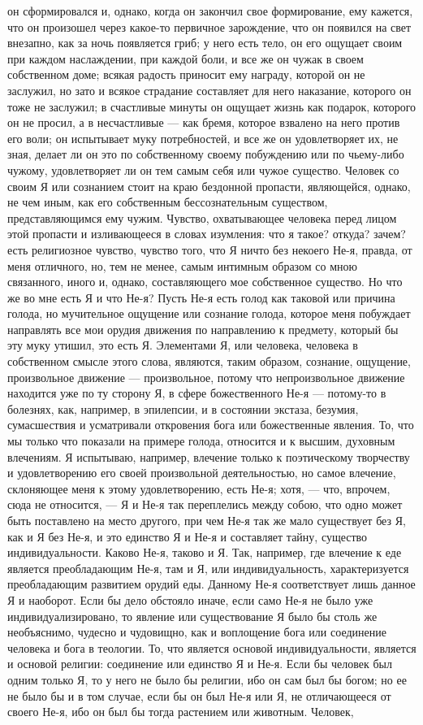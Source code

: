 \documentclass[12pt]{article}
\begin{document}
он сформировался и, однако, когда он закончил свое формирование, ему кажется, что он произошел через какое-то первичное зарождение, что он появился на свет внезапно, как за ночь появляется гриб; у него есть тело, он его ощущает своим при каждом наслаждении, при каждой боли, и все же он чужак в своем собственном доме; всякая радость приносит ему награду, которой он не заслужил, но зато и всякое страдание составляет для него наказание, которого он тоже не заслужил; в счастливые минуты он ощущает жизнь как подарок, которого он не просил, а в несчастливые --- как бремя, которое взвалено на него против его воли; он испытывает муку потребностей, и все же он удовлетворяет их, не зная, делает ли он это по собственному своему побуждению или по чьему-либо чужому, удовлетворяет ли он тем самым себя или чужое существо. Человек со своим Я или сознанием стоит на краю бездонной пропасти, являющейся, однако, не чем иным, как его собственным бессознательным существом, представляющимся ему чужим. Чувство, охватывающее человека перед лицом этой пропасти и изливающееся в словах изумления: что я такое? откуда? зачем? есть религиозное чувство, чувство того, что Я ничто без некоего Не-я, правда, от меня отличного, но, тем не менее, самым интимным образом со мною связанного, иного и, однако, составляющего мое собственное существо. Но что же во мне есть Я и что Не-я? Пусть Не-я есть голод как таковой или причина голода, но мучительное ощущение или сознание голода, которое меня побуждает направлять все мои орудия движения по направлению к предмету, который бы эту муку утишил, это есть Я. Элементами Я, или человека, человека в собственном смысле этого слова, являются, таким образом, сознание, ощущение, произвольное движение --- произвольное, потому что непроизвольное движение находится уже по ту сторону Я, в сфере божественного Не-я --- потому-то в болезнях, как, например, в эпилепсии, и в состоянии экстаза, безумия, сумасшествия и усматривали откровения бога или божественные явления. То, что мы только что показали на примере голода, относится и к высшим, духовным влечениям. Я испытываю, например, влечение только к поэтическому творчеству и удовлетворению его своей произвольной деятельностью, но самое влечение, склоняющее меня к этому удовлетворению, есть Не-я; хотя, --- что, впрочем, сюда не относится, --- Я и Не-я так переплелись между собою, что одно может быть поставлено на место другого, при чем Не-я так же мало существует без Я, как и Я без Не-я, и это единство Я и Не-я и составляет тайну, существо индивидуальности. Каково Не-я, таково и Я. Так, например, где влечение к еде является преобладающим Не-я, там и Я, или индивидуальность, характеризуется преобладающим развитием орудий еды. Данному Не-я соответствует лишь данное Я и наоборот. Если бы дело обстояло иначе, если само Не-я не было уже индивидуализировано, то явление или существование Я было бы столь же необъяснимо, чудесно и чудовищно, как и воплощение бога или соединение человека и бога в теологии. То, что является основой индивидуальности, является и основой религии: соединение или единство Я и Не-я. Если бы человек был одним только Я, то у него не было бы религии, ибо он сам был бы богом; но ее не было бы и в том случае, если бы он был Не-я или Я, не отличающееся от своего Не-я, ибо он был бы тогда растением или животным. Человек, 
\end{document}
